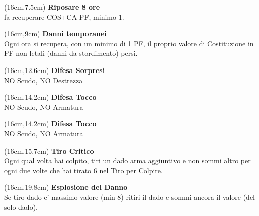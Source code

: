 \documentclass[a4paper,12 pt,openany]{book}
\begin{document}
	\begin{textblock*}{4cm}(16cm,7.5cm) %
{\footnotesize\textbf{Riposare 8 ore} \\fa recuperare COS+CA PF, minimo 1.}
		\end{textblock*}


		\begin{textblock*}{4cm}(16cm,9cm) %
		{\footnotesize
\textbf{Danni temporanei}\\ Ogni ora si recupera, con un minimo di 1 PF, il proprio valore di Costituzione in PF non letali (danni da stordimento) persi.}
	\end{textblock*}


\begin{textblock*}{4cm}(16cm,12.6cm) %
\textbf{Difesa Sorpresi}\\NO Scudo, NO Destrezza
\end{textblock*}

\begin{textblock*}{4cm}(16cm,14.2cm) %
\textbf{Difesa Tocco}\\ NO Scudo, NO Armatura
\end{textblock*}



\begin{textblock*}{4cm}(16cm,14.2cm) %
	\textbf{Difesa Tocco}\\ NO Scudo, NO Armatura
\end{textblock*}


\begin{textblock*}{4cm}(16cm,15.7cm) %
\textbf{Tiro Critico}\\
Ogni qual volta hai colpito, tiri un dado arma aggiuntivo e non sommi altro per ogni due volte che hai tirato 6 nel Tiro per Colpire.
\end{textblock*}

\begin{textblock*}{4cm}(16cm,19.8cm) %
\textbf{Esplosione del Danno}\\
Se tiro dado e' massimo valore (min 8) ritiri il dado e sommi ancora il valore (del solo dado).
\end{textblock*}


\end{document}
